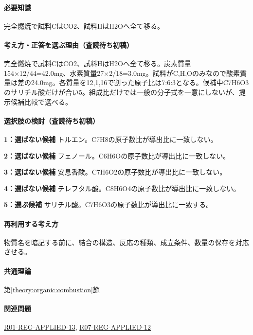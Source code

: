 \paragraph{必要知識} 完全燃焼で試料CはCO2、試料HはH2Oへ全て移る。

\paragraph{考え方・正答を選ぶ理由（査読待ち初稿）} 完全燃焼で試料CはCO2、試料HはH2Oへ全て移る。炭素質量154×12/44=\allowbreak{}42.0mg、水素質量27×2/18=\allowbreak{}3.0mg。試料がC,H,Oのみなので酸素質量は差の24.0mg。各質量を12,1,16で割った原子比は7:6:3となる。候補中C7H6O3のサリチル酸だけが合い5。組成比だけでは一般の分子式を一意にしないが、提示候補比較で選べる。

\paragraph{選択肢の検討（査読待ち初稿）}\mbox{}\par

\noindent\textbf{1：選ばない候補} トルエン。C7H8の原子数比が導出比に一致しない。\par

\noindent\textbf{2：選ばない候補} フェノール。C6H6Oの原子数比が導出比に一致しない。\par

\noindent\textbf{3：選ばない候補} 安息香酸。C7H6O2の原子数比が導出比に一致しない。\par

\noindent\textbf{4：選ばない候補} テレフタル酸。C8H6O4の原子数比が導出比に一致しない。\par

\noindent\textbf{5：選ぶ候補} サリチル酸。C7H6O3の原子数比が導出比に一致する。\par

\paragraph{再利用する考え方} 物質名を暗記する前に、結合の構造、反応の種類、成立条件、数量の保存を対応させる。

\paragraph{共通理論} \hyperref[theory:organic:combustion]{第\ref*{theory:organic:combustion}節}

\paragraph{関連問題} \hyperref[q:r01-reg-applied-13]{R01-REG-APPLIED-13}, \hyperref[q:r07-reg-applied-12]{R07-REG-APPLIED-12}

